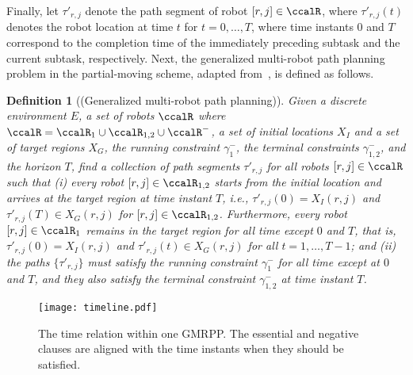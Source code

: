 \documentclass[Afour,sageh,times]{sagej}
\newtheorem{defn}[thm]{Definition}
\begin{document}
{Finally, let $\tau'_{r,j}$ denote the path segment of robot $[r,j] \in \ccalR$, where $\tau'_{r,j}(t)$ denotes the robot location at time $t$ for $ t = 0,  \ldots, T$, where time instants 0  and $T$ correspond to the completion time of the immediately preceding subtask and the current subtask, respectively. Next, the generalized multi-robot path planning problem in the partial-moving scheme, adapted from~\cite{yu2016optimal}, is defined as follows.
 \begin{defn}[(Generalized multi-robot path planning)]\label{defn:gmmpp}
    Given a discrete environment $E$, a set of robots $\ccalR$ where $\ccalR = \ccalR_1 \cup\ccalR_{1,2} \cup \ccalR^-$, a set of initial locations $X_I$ and a set of target regions $X_G$, the running constraint $\gamma_1^-$, the terminal constraints $\gamma_{1,2}^-$, and the horizon $T$, find a collection of path segments $\tau'_{r,j}$ for all robots $[r,j]\in \ccalR$ such that {\it (i)} every robot $[r,j] \in \ccalR_{1,2}$ starts from the initial location and arrives at the target region at time instant $T$, i.e., $ \tau'_{r,j}(0) = X_I(r,j)$ and  $ \tau'_{r,j}(T) \in X_G(r,j)$ for $[r,j] \in  \ccalR_{1,2}$. Furthermore, every robot $[r,j] \in \ccalR_1$ remains in the target region for all time except $0$ and $T$, that is, $ \tau'_{r,j}(0) = X_I(r,j)$ and $\tau'_{r,j}(t) \in X_G(r,j)$ for all $t=1,\ldots, T-1$;
  and {\it (ii)} the paths $\{\tau'_{r,j}\}$ must satisfy the running constraint $\gamma^-_1$ for all time except at $0$ and $T$, and they also satisfy the terminal constraint $\gamma^-_{1,2}$ at time instant $T$.
 \end{defn}

 \begin{figure}[!t]
   \centering
   \texttt{[image: timeline.pdf]}
   \caption{The time relation within one GMRPP. The essential and negative clauses are aligned with the time instants when they should be satisfied.}
   \label{fig:timeline}
 \end{figure}

}
\end{document}

